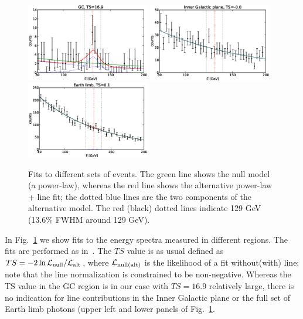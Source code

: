 \documentclass[aps,twocolumn,prd,superscriptaddress,showpacs,nofootinbib,fixfloat]{revtex4}
\begin{document}
\begin{figure}
  \centering
  \includegraphics[width=0.48\textwidth]{plots/counts_GC.eps}
  \includegraphics[width=0.48\textwidth]{plots/counts_IGP.eps}
  \includegraphics[width=0.48\textwidth]{plots/counts_limb.eps}
  \caption{Fits to different sets of events. The green line
  shows the null model (a power-law), whereas the red line
  shows the alternative power-law + line fit; the dotted
  blue lines are the two components of the alternative
  model. The red (black) dotted lines indicate 129 GeV
  (13.6\% FWHM around 129 GeV).}
  \label{fig:spectra1}
\end{figure}

In Fig.~\ref{fig:spectra1} we show fits to the energy
spectra measured in different regions. The fits are
performed as in~\cite{Weniger:2012}. The $TS$ value is as
usual defined as $TS=-2\ln \mathcal{L}_{\rm
null}/\mathcal{L}_{\rm alt}$, where $\mathcal{L}_{\rm
null(alt)}$ is the likelihood of a fit without(with) line;
note that the line normalization is constrained to be
non-negative. Whereas the TS value in the GC region is in
our case with $TS=16.9$ relatively large, there is no
indication for line contributions in the Inner Galactic
plane or the full set of Earth limb photons (upper left and
lower panels of Fig.~\ref{fig:spectra1}.
\end{document}
